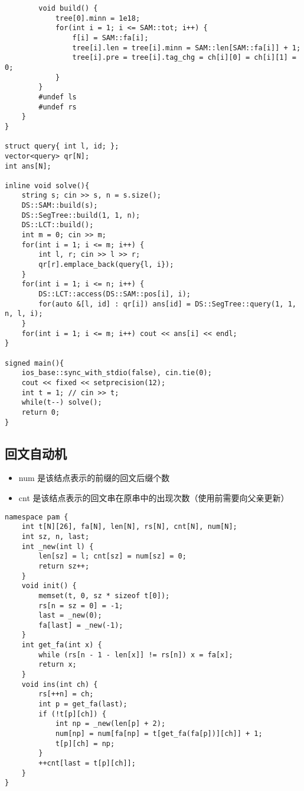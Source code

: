 \documentclass[]{article}
\providecommand{\tightlist}{%
  \setlength{\itemsep}{0pt}\setlength{\parskip}{0pt}}
\begin{document}
\begin{verbatim}
        void build() {
            tree[0].minn = 1e18;
            for(int i = 1; i <= SAM::tot; i++) {
                f[i] = SAM::fa[i];
                tree[i].len = tree[i].minn = SAM::len[SAM::fa[i]] + 1;
                tree[i].pre = tree[i].tag_chg = ch[i][0] = ch[i][1] = 0;
            }
        }
        #undef ls
        #undef rs
    }
}

struct query{ int l, id; };
vector<query> qr[N];
int ans[N];

inline void solve(){
    string s; cin >> s, n = s.size();
    DS::SAM::build(s);
    DS::SegTree::build(1, 1, n);
    DS::LCT::build();
    int m = 0; cin >> m;
    for(int i = 1; i <= m; i++) {
        int l, r; cin >> l >> r;
        qr[r].emplace_back(query{l, i});      
    }
    for(int i = 1; i <= n; i++) {
        DS::LCT::access(DS::SAM::pos[i], i);
        for(auto &[l, id] : qr[i]) ans[id] = DS::SegTree::query(1, 1, n, l, i);
    }
    for(int i = 1; i <= m; i++) cout << ans[i] << endl;
}

signed main(){
    ios_base::sync_with_stdio(false), cin.tie(0);
    cout << fixed << setprecision(12);
    int t = 1; // cin >> t;
    while(t--) solve();
    return 0;
}
\end{verbatim}

\hypertarget{ux56deux6587ux81eaux52a8ux673a}{%
\subsection{回文自动机}\label{ux56deux6587ux81eaux52a8ux673a}}

\begin{itemize}
\tightlist
\item
  num 是该结点表示的前缀的回文后缀个数
\item
  cnt 是该结点表示的回文串在原串中的出现次数（使用前需要向父亲更新）
\end{itemize}

\begin{verbatim}
namespace pam {
    int t[N][26], fa[N], len[N], rs[N], cnt[N], num[N];
    int sz, n, last;
    int _new(int l) {
        len[sz] = l; cnt[sz] = num[sz] = 0;
        return sz++;
    }
    void init() {
        memset(t, 0, sz * sizeof t[0]);
        rs[n = sz = 0] = -1;
        last = _new(0);
        fa[last] = _new(-1);
    }
    int get_fa(int x) {
        while (rs[n - 1 - len[x]] != rs[n]) x = fa[x];
        return x;
    }
    void ins(int ch) {
        rs[++n] = ch;
        int p = get_fa(last);
        if (!t[p][ch]) {
            int np = _new(len[p] + 2);
            num[np] = num[fa[np] = t[get_fa(fa[p])][ch]] + 1;
            t[p][ch] = np;
        }
        ++cnt[last = t[p][ch]];
    }
}
\end{verbatim}
\end{document}
